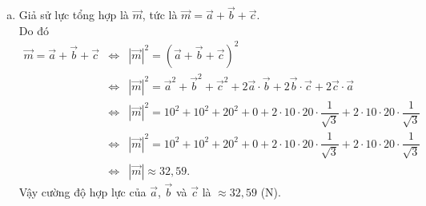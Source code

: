\begin{ex}
{\begin{enumerate}[a)]
\begin{itemize}
				Suy ra $\big|\vec{a}+\vec{c}\big|=\sqrt{500+\dfrac{400\sqrt{3}}{3}}$.
				\item [$\bullet$] $\big(\vec{b}+\vec{c}\big)^2=|\vec{b}|^2+2\vec{b} \cdot \vec{c}+|\vec{c}|^2=10^2+2.10.20.\dfrac{1}{\sqrt{3}}+20^2=500+\dfrac{400\sqrt{3}}{3}$.\\
				Suy ra $\big|\vec{b}+\vec{c}\big|=\sqrt{500+\dfrac{400\sqrt{3}}{3}}$.
			\end{itemize}
			Vậy $\big|\vec{a}+\vec{c}\big|=\big|\vec{b}+\vec{c}\big|$.
			\item Giả sử lực tổng hợp là $\vec{m}$, tức là $\vec{m}=\vec{a}+\vec{b}+\vec{c}$.\\
			Do đó
			\allowdisplaybreaks 
			\begin{eqnarray*}
				\vec{m}=\vec{a}+\vec{b}+\vec{c} &\Leftrightarrow& \left|\vec{m}\right|^2= \left(\vec{a}+\vec{b}+\vec{c}\right)^2\\
				&\Leftrightarrow& \left|\vec{m}\right|^2= \vec{a}^2+\vec{b}^2+\vec{c}^2+2\vec{a}\cdot\vec{b}+2\vec{b}\cdot\vec{c}+2\vec{c}\cdot\vec{a}\\
				&\Leftrightarrow& \left|\vec{m}\right|^2= 10^2+10^2+20^2+0+2\cdot 10\cdot 20 \cdot \dfrac{1}{\sqrt3} +2\cdot 10\cdot 20 \cdot \dfrac{1}{\sqrt3}\\
				&\Leftrightarrow& \left|\vec{m}\right|^2= 10^2+10^2+20^2+0+2\cdot 10\cdot 20 \cdot \dfrac{1}{\sqrt3} +2\cdot 10\cdot 20 \cdot \dfrac{1}{\sqrt3}\\
				&\Leftrightarrow& \left|\vec{m}\right| \approx 32{,}59.
			\end{eqnarray*}
			Vậy cường độ hợp lực của $\vec{a}$, $\vec{b}$ và $\vec{c}$ là $\approx 32{,}59$ (N).
		\end{enumerate}
		
	}
\end{ex} 



